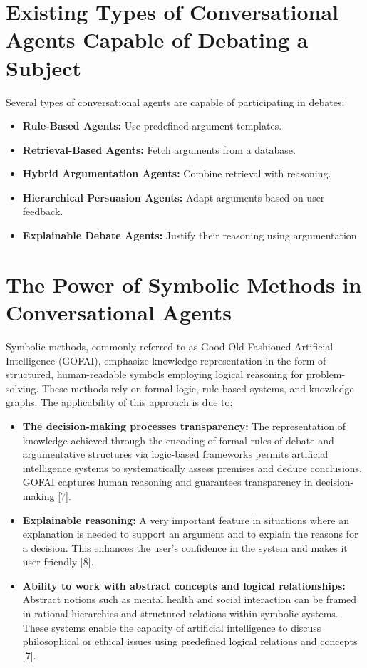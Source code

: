 \documentclass[conference]{IEEEtran}
\begin{document}
\section{Existing Types of Conversational Agents Capable of Debating a Subject}
Several types of conversational agents are capable of participating in debates:

\begin{itemize}
    \item \textbf{Rule-Based Agents:} Use predefined argument templates.
    \item \textbf{Retrieval-Based Agents:} Fetch arguments from a database.
    \item \textbf{Hybrid Argumentation Agents:} Combine retrieval with reasoning.
    \item \textbf{Hierarchical Persuasion Agents:} Adapt arguments based on user feedback.
    \item \textbf{Explainable Debate Agents:} Justify their reasoning using argumentation.
\end{itemize}


\section{The Power of Symbolic Methods in Conversational Agents}
Symbolic methods, commonly referred to as Good Old-Fashioned Artificial Intelligence (GOFAI), emphasize knowledge representation in the form of structured, human-readable symbols employing logical reasoning for problem-solving. These methods rely on formal logic, rule-based systems, and knowledge graphs. The applicability of this approach is due to:

\begin{itemize}
    \item \textbf{The decision-making processes transparency:} The representation of knowledge achieved through the encoding of formal rules of debate and argumentative structures via logic-based frameworks permits artificial intelligence systems to systematically assess premises and deduce conclusions. GOFAI captures human reasoning and guarantees transparency in decision-making [7].
    
    \item \textbf{Explainable reasoning:} A very important feature in situations where an explanation is needed to support an argument and to explain the reasons for a decision. This enhances the user's confidence in the system and makes it user-friendly [8].
    
    \item \textbf{Ability to work with abstract concepts and logical relationships:} Abstract notions such as mental health and social interaction can be framed in rational hierarchies and structured relations within symbolic systems. These systems enable the capacity of artificial intelligence to discuss philosophical or ethical issues using predefined logical relations and concepts [7].
\end{itemize}
\end{document}
